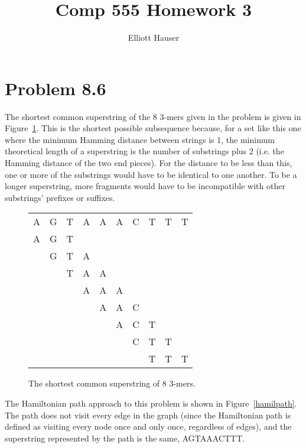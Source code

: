 \documentclass[12pt]{article}
\title{Comp 555 Homework 3}
\author{Elliott Hauser}
\begin{document}
\maketitle
\section{Problem 8.6}

The shortest common superstring of the 8 3-mers given in the problem is given in Figure~\ref{SCS}.  This is the shortest possible subsequence because, for a set like this one where the minimum Hamming distance between strings is 1, the minimum theoretical length of a superstring is the number of substrings plus 2 (i.e. the Hamming distance of the two end pieces).  For the distance to be less than this, one or more of the substrings would have to be identical to one another.  To be a longer superstring, more fragments would have to be incompatible with other substrings' prefixes or suffixes.

\begin{figure}[hb]
\begin{center}
\begin{tabular}{cccccccccc}
A&G&T&A&A&A&C&T&T&T\\
A&G&T\\
 & G&T&A\\
&&T&A&A\\
&&&A&A&A\\
&&&&A&A&C\\
&&&&&A&C&T\\
&&&&&&C&T&T\\
&&&&&&&T&T&T\\
\end{tabular}
\end{center}
\caption{The shortest common superstring of 8 3-mers.}
\label{SCS}
\end{figure}




The Hamiltonian path approach to this problem is shown in Figure~\ref{hamilpath}.  The path does not visit every edge in the graph (since the Hamiltonian path is defined as visiting every node once and only once, regardless of edges), and the superstring represented by the path is the same, AGTAAACTTT.
\end{document}
